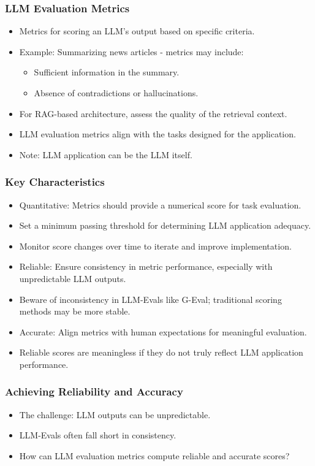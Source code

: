 \begin{frame}[fragile]\frametitle{LLM Evaluation Metrics}
  \begin{itemize}
    \item Metrics for scoring an LLM's output based on specific criteria.
    \item Example: Summarizing news articles - metrics may include:
      \begin{itemize}
        \item Sufficient information in the summary.
        \item Absence of contradictions or hallucinations.
      \end{itemize}
    \item For RAG-based architecture, assess the quality of the retrieval context.
    \item LLM evaluation metrics align with the tasks designed for the application.
    \item Note: LLM application can be the LLM itself.
  \end{itemize}
\end{frame}

\begin{frame}[fragile]\frametitle{Key Characteristics}
  \begin{itemize}
    \item Quantitative: Metrics should provide a numerical score for task evaluation.
    \item Set a minimum passing threshold for determining LLM application adequacy.
    \item Monitor score changes over time to iterate and improve implementation.
    \item Reliable: Ensure consistency in metric performance, especially with unpredictable LLM outputs.
    \item Beware of inconsistency in LLM-Evals like G-Eval; traditional scoring methods may be more stable.
    \item Accurate: Align metrics with human expectations for meaningful evaluation.
    \item Reliable scores are meaningless if they do not truly reflect LLM application performance.
  \end{itemize}
\end{frame}

\begin{frame}[fragile]\frametitle{Achieving Reliability and Accuracy}
  \begin{itemize}
    \item The challenge: LLM outputs can be unpredictable.
    \item LLM-Evals often fall short in consistency.
    \item How can LLM evaluation metrics compute reliable and accurate scores?
  \end{itemize}
\end{frame}


